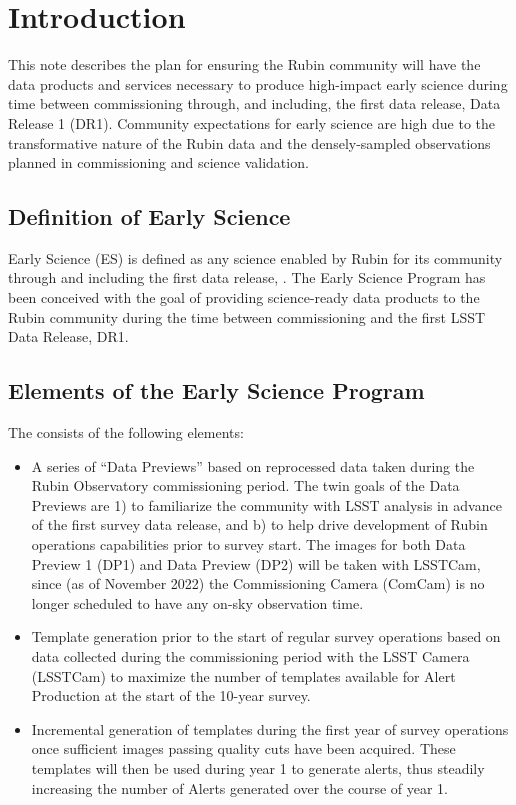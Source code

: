 \section{Introduction}

This note describes the plan for ensuring the Rubin community will have the data products and services necessary to produce high-impact early science during time between commissioning through, and including, the first data release, Data Release 1 (DR1).
Community expectations for early science are high due to the transformative nature of the Rubin data and the densely-sampled observations planned in commissioning and science validation.

\subsection{Definition of Early Science}  \label{ssec:defn}

Early Science (ES) is defined as any science enabled by Rubin for its community through and including the first data release, \drone.
The Early Science Program has been conceived with the goal of providing science-ready data products to the Rubin community during the time between commissioning and the first LSST Data Release, DR1.

\subsection{Elements of the Early Science Program}

The \esp consists of the following elements:
\begin{itemize}
	\item A series of ``Data Previews'' based on reprocessed data taken during the Rubin Observatory commissioning period.
	The twin goals of the Data Previews are 1) to familiarize the community with LSST analysis in advance of the first survey data release, and b) to help drive development of Rubin operations capabilities prior to survey start.
	The images for both Data Preview 1 (DP1) and Data Preview (DP2) will be taken with LSSTCam, since (as of November 2022) the Commissioning Camera (ComCam) is no longer scheduled to have any on-sky observation time.
	\item Template generation prior to the start of regular survey operations based on data collected during the commissioning period with the LSST Camera (LSSTCam) to maximize the number of templates available for Alert Production at the start of the 10-year survey.
	\item Incremental generation of templates during the first year of survey operations once sufficient images passing quality cuts have been acquired. These templates will then be used during year 1 to generate alerts, thus steadily increasing the number of Alerts generated over the course of year 1.
\end{itemize}


